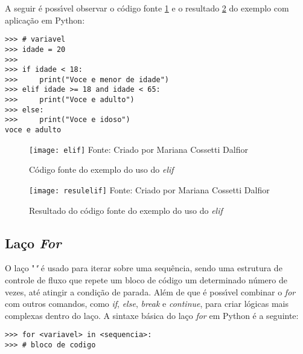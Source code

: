 A seguir \'{e} poss\'{\i}vel observar o c\'{o}digo fonte \ref{fonteelif} e o resultado \ref{resulelif} do exemplo com aplica\c{c}\~{a}o em Python:

\begin{lstlisting}
>>> # variavel
>>> idade = 20
>>> 
>>> if idade < 18:
>>> 	print("Voce e menor de idade")
>>> elif idade >= 18 and idade < 65:
>>> 	print("Voce e adulto")
>>> else:
>>> 	print("Voce e idoso")
voce e adulto
\end{lstlisting}	

\begin{figure}[H]
	\begin{center}
		\caption{C\'{o}digo fonte do exemplo do uso do \textsl{elif}} \label{fonteelif}
		\texttt{[image: elif]} 
		\newline
		Fonte: Criado por Mariana Cossetti Dalfior
	\end{center}
\end{figure}

\begin{figure}[H]
	\begin{center}
		\caption{Resultado do c\'{o}digo fonte do exemplo do uso do \textsl{elif}} \label{resulelif}
		\texttt{[image: resulelif]} 
		\newline
		Fonte: Criado por Mariana Cossetti Dalfior
	\end{center}
\end{figure}

            \subsection{La\c{c}o \textsl{For}}
O la\c{c}o "\textsl" \'{e} usado para iterar sobre uma sequ\^{e}ncia, sendo uma estrutura de controle de fluxo que repete um bloco de c\'{o}digo um determinado n\'{u}mero de vezes, at\'{e} atingir a condi\c{c}\~{a}o de parada. Al\'{e}m de que \'{e} poss\'{\i}vel combinar o \textsl{for} com outros comandos, como \textsl{if}, \textsl{else}, \textsl{break} e \textsl{continue}, para criar l\'{o}gicas mais complexas dentro do la\c{c}o. A sintaxe b\'{a}sica do la\c{c}o \textsl{for} em Python \'{e} a seguinte:

\begin{lstlisting}
>>> for <variavel> in <sequencia>:
>>> # bloco de codigo
\end{lstlisting}	

